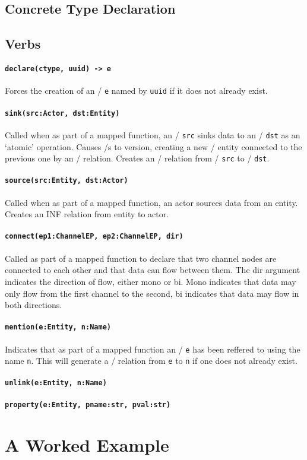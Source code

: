 \documentclass[12pt,twoside,a4paper]{article}
\newcommand{\field}[1]{\texttt{#1}}
\newcommand{\para}[1]{\paragraph{#1\\}}
\begin{document}
\subsection{Concrete Type Declaration}
\label{sec:map:tydef}

\subsection{Verbs}
\label{sec:map:verbs}

\para{\texttt{declare(ctype, uuid) -> e}}
\label{sec:map:verbs:declare}
Forces the creation of an \Entity/ \field{e} named by \field{uuid} if it does not already exist.

\para{\texttt{sink(src:Actor, dst:Entity)}}
\label{sec:map:verbs:sink}
Called when as part of a mapped function, an \Actor/ \field{src} sinks data to an \Entity/ \field{dst} as an ‘atomic’ operation.
Causes \Store/s to version, creating a new \Store/ entity connected to the previous one by an \INF/ relation.
Creates an \INF/ relation from \Actor/ \field{src} to \Entity/ \field{dst}. 

\para{\texttt{source(src:Entity, dst:Actor)}}
\label{sec:map:verbs:source}
Called when as part of a mapped function, an actor sources data from an entity.
Creates an INF relation from entity to actor.

\para{\texttt{connect(ep1:ChannelEP, ep2:ChannelEP, dir)}}
\label{sec:map:verbs:connect}
Called as part of a mapped function to declare that two channel nodes are connected to each other and that data can flow between them. The dir argument indicates the direction of flow, either mono or bi. Mono indicates that data may only flow from the first channel to the second, bi indicates that data may flow in both directions. 

\para{\texttt{mention(e:Entity, n:Name)}}
\label{sec:map:verbs:mention}
Indicates that as part of a mapped function an \Entity/ \field{e} has been reffered to using the name \field{n}. This will generate a \NAMED/ relation from \field{e} to \field{n} if one does not already exist.

\para{\texttt{unlink(e:Entity, n:Name)}}
\label{sec:map:verbs:unlink}

\para{\texttt{property(e:Entity, pname:str, pval:str)}}
\label{sec:map:verbs:property}

\appendix

\section{A Worked Example}
\label{app:example}
\end{document}
